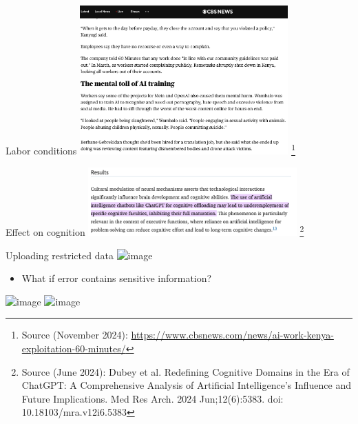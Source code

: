 \documentclass[t,xcolor={dvipsnames},final,aspectratio=169]{beamer}
\begin{document}
{
\begin{frame}{Labor conditions}
\includegraphics[width=0.6\textwidth]{img/labor.png}
\footnote{Source (November 2024): \url{https://www.cbsnews.com/news/ai-work-kenya-exploitation-60-minutes/}}
\end{frame}
}

{
\begin{frame}{Effect on cognition}
\includegraphics[width=0.6\textwidth]{img/cognition.png}
\footnote{Source (June 2024): Dubey et al. Redefining Cognitive Domains in the Era of ChatGPT: A Comprehensive Analysis of Artificial Intelligence's Influence and Future Implications. Med Res Arch. 2024 Jun;12(6):5383. doi: 10.18103/mra.v12i6.5383}
\end{frame}
}

\begin{frame}{Uploading restricted data}
\includegraphics<+->[width=8cm]{img/llm.png}
\begin{itemize}
\item What if error contains sensitive information?
\end{itemize}
\includegraphics<+->[width=8cm]{img/municipalitiescode.png}
\includegraphics<+->[width=8cm]{img/municipalitieserror.png}
\end{frame}

\end{document}
